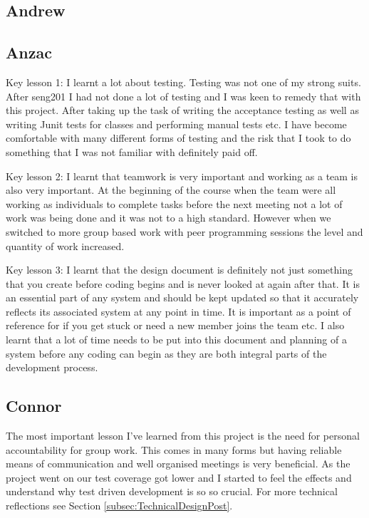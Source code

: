 \subsection{Andrew}

\subsection{Anzac}
Key lesson 1:
I learnt a lot about testing. Testing was not one of my strong suits. After seng201 I had not done a lot of testing and I was keen to remedy that with this project. After taking up the task of writing the acceptance testing as well as writing Junit tests for classes and performing manual tests etc. I have become comfortable with many different forms of testing and the risk that I took to do something that I was not familiar with definitely paid off.

Key lesson 2:
I learnt that teamwork is very important and working as a team is also very important. At the beginning of the course when the team were all working as individuals to complete tasks before the next meeting not a lot of work was being done and it was not to a high standard. However when we switched to more group based work with peer programming sessions the level and quantity of work increased.

Key lesson 3:
I learnt that the design document is definitely not just something that you create before coding begins and is never looked at again after that. It is an essential part of any system and should be kept updated so that it accurately reflects its associated system  at any point in time. It is important as a point of reference for if you get stuck or need a new member joins the team etc. I also learnt that a lot of time needs to be put into this document and planning of a system before any coding can begin as they are both integral parts of the development process.


\subsection{Connor}
The most important lesson I've learned from this project is the need for personal accountability for group work. This comes in many forms but having reliable means of communication and well organised meetings is very beneficial. As the project went on our test coverage got lower and I started to feel the effects and understand why test driven development is so so crucial. For more technical reflections see Section \ref{subsec:TechnicalDesignPost}.

